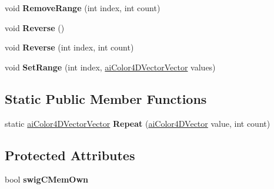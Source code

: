 \begin{DoxyCompactItemize}
\item 
\hypertarget{classai_color4_d_vector_vector_a2f1c536ed65ca6cb7f706098ac3c5d16}{void {\bfseries Remove\+Range} (int index, int count)}\label{classai_color4_d_vector_vector_a2f1c536ed65ca6cb7f706098ac3c5d16}

\item 
\hypertarget{classai_color4_d_vector_vector_ae7a277b0d4bd0c8016ff64efd7ad3573}{void {\bfseries Reverse} ()}\label{classai_color4_d_vector_vector_ae7a277b0d4bd0c8016ff64efd7ad3573}

\item 
\hypertarget{classai_color4_d_vector_vector_a1d8f498b278da2ccaffa836cfc41c7e7}{void {\bfseries Reverse} (int index, int count)}\label{classai_color4_d_vector_vector_a1d8f498b278da2ccaffa836cfc41c7e7}

\item 
\hypertarget{classai_color4_d_vector_vector_aaea75bcdb564822cf408495324fa9163}{void {\bfseries Set\+Range} (int index, \hyperlink{classai_color4_d_vector_vector}{ai\+Color4\+D\+Vector\+Vector} values)}\label{classai_color4_d_vector_vector_aaea75bcdb564822cf408495324fa9163}

\end{DoxyCompactItemize}
\subsection*{Static Public Member Functions}
\begin{DoxyCompactItemize}
\item 
\hypertarget{classai_color4_d_vector_vector_a2faf0e17c5e9e0fdc4feefd4181d0c60}{static \hyperlink{classai_color4_d_vector_vector}{ai\+Color4\+D\+Vector\+Vector} {\bfseries Repeat} (\hyperlink{classai_color4_d_vector}{ai\+Color4\+D\+Vector} value, int count)}\label{classai_color4_d_vector_vector_a2faf0e17c5e9e0fdc4feefd4181d0c60}

\end{DoxyCompactItemize}
\subsection*{Protected Attributes}
\begin{DoxyCompactItemize}
\item 
\hypertarget{classai_color4_d_vector_vector_a9ef2d9d45760ce1adb9aafbf41bf90bd}{bool {\bfseries swig\+C\+Mem\+Own}}\label{classai_color4_d_vector_vector_a9ef2d9d45760ce1adb9aafbf41bf90bd}

\end{DoxyCompactItemize}
